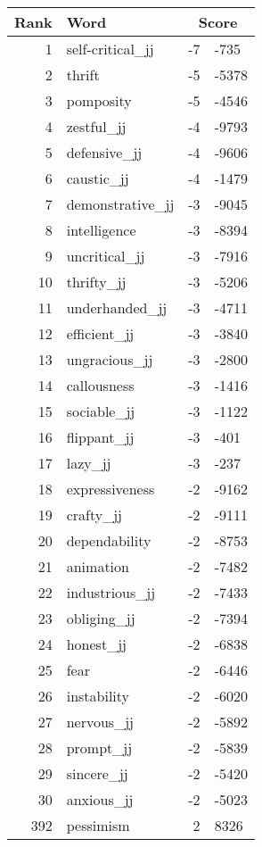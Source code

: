 \begin{longtable}[!htbp]{| rlr@{.}l |}
    \hline
    \textbf{Rank} & \textbf{Word} & \multicolumn{2}{c|}{\textbf{Score}} \\
    \hline
    \endhead
    1 & self-critical\_jj & -7 & -735 \\
    2 & thrift & -5 & -5378 \\
    3 & pomposity & -5 & -4546 \\
    4 & zestful\_jj & -4 & -9793 \\
    5 & defensive\_jj & -4 & -9606 \\
    6 & caustic\_jj & -4 & -1479 \\
    7 & demonstrative\_jj & -3 & -9045 \\
    8 & intelligence & -3 & -8394 \\
    9 & uncritical\_jj & -3 & -7916 \\
    10 & thrifty\_jj & -3 & -5206 \\
    11 & underhanded\_jj & -3 & -4711 \\
    12 & efficient\_jj & -3 & -3840 \\
    13 & ungracious\_jj & -3 & -2800 \\
    14 & callousness & -3 & -1416 \\
    15 & sociable\_jj & -3 & -1122 \\
    16 & flippant\_jj & -3 & -401 \\
    17 & lazy\_jj & -3 & -237 \\
    18 & expressiveness & -2 & -9162 \\
    19 & crafty\_jj & -2 & -9111 \\
    20 & dependability & -2 & -8753 \\
    21 & animation & -2 & -7482 \\
    22 & industrious\_jj & -2 & -7433 \\
    23 & obliging\_jj & -2 & -7394 \\
    24 & honest\_jj & -2 & -6838 \\
    25 & fear & -2 & -6446 \\
    26 & instability & -2 & -6020 \\
    27 & nervous\_jj & -2 & -5892 \\
    28 & prompt\_jj & -2 & -5839 \\
    29 & sincere\_jj & -2 & -5420 \\
    30 & anxious\_jj & -2 & -5023 \\
    392 & pessimism & 2 & 8326 \\

\end{longtable}
